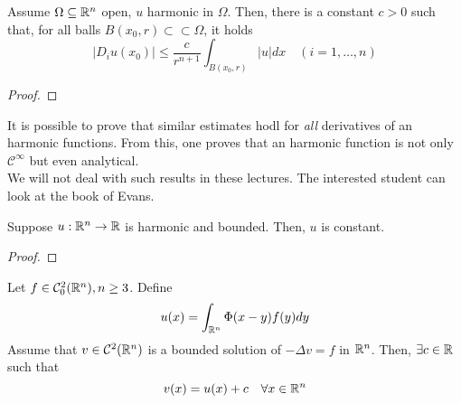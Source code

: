 \begin{ThBox}
    \begin{Lemma}
        Assume $\Omega \subseteq \mathbb{R}^n$ open, $u$ harmonic in $\Omega$. Then, there is a constant $c > 0$ such that, for all balls $B(x_0,r) \subset \subset \Omega$, it holds
        \begin{equation*}
            |D_iu(x_0)| \leq \frac{c}{r^{n+1}}\int_{B(x_0,r)}|u| dx \quad (i=1,\ldots,n)
        \end{equation*}
    \end{Lemma}
\end{ThBox}
\begin{ProofBox}
    \begin{proof}
        
    \end{proof}
\end{ProofBox}
\begin{remark}
    It is possible to prove that similar estimates hodl for \emph{all} derivatives of an harmonic functions. From this, one proves that an harmonic function is not only $\mathcal{C}^\infty$ but even analytical. \\
    We will not deal with such results in these lectures. The interested student can look at the book of Evans. 
\end{remark}
\begin{ThBox}
    \begin{Th}[Liouville]
        Suppose $u: \mathbb{R}^n \rightarrow \mathbb{R}$ is harmonic and bounded. Then, $u$ is constant. 
    \end{Th}
\end{ThBox}
\begin{ProofBox}
    \begin{proof}
        
    \end{proof}
\end{ProofBox}
\begin{ThBox}
    \begin{Th}
        Let $f \in \mathcal{C}^2_0(\mathbb{R}^n), n \geq 3$. Define 
        \begin{equation*}
            u(x)=\int_{\mathbb{R}^n} \Phi(x-y) f(y) dy
        \end{equation*}
        Assume that $v \in \mathcal{C}^2(\mathbb{R}^n)$ is a bounded solution of $- \Delta v = f$ in $\mathbb{R}^n$. Then, $\exists c \in \mathbb{R} $ such that 
        \begin{equation*}
            v(x) = u(x) + c \quad \forall x \in \mathbb{R}^n
        \end{equation*}
    \end{Th}
\end{ThBox}
